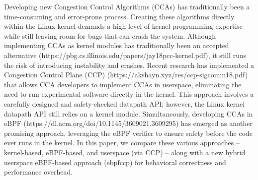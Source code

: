 \documentclass[../main.tex]{subfiles}
\begin{document}
Developing new Congestion Control Algorithms (CCAs) has traditionally been a time-consuming and error-prone process. Creating these algorithms directly within the Linux kernel demands a high level of kernel programming expertise while still leaving room for bugs that can crash the system. Although implementing CCAs as kernel modules has traditionally been an accepted alternative (https://pbg.cs.illinois.edu/papers/jay18pcc-kernel.pdf), it still runs the risk of introducing instability and crashes. Recent research has implemented a Congestion Control Plane (CCP) (https://akshayn.xyz/res/ccp-sigcomm18.pdf) that allows CCA developers to implement CCAs in userspace, eliminating the need to run experimental software directly in the kernel. This approach involves a carefully designed and safety-checked datapath API; however, the Linux kernel datapath API still relies on a kernel module. Simultaneously, developing CCAs in eBPF (https://dl.acm.org/doi/10.1145/3609021.3609295) has emerged as another promising approach, leveraging the eBPF verifier to ensure safety before the code ever runs in the kernel. In this paper, we compare these various approaches -- kernel-based, eBPF-based, and userspace (via CCP) -- along with a new hybrid userspace eBPF-based approach (ebpfccp) for behavioral correctness and performance overhead.
\end{document}

